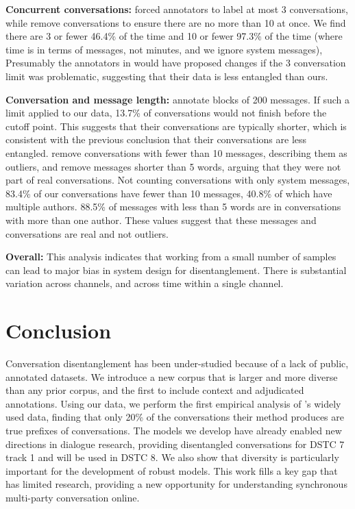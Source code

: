\documentclass[11pt,a4paper]{article}
\newcommand{\tightparagraph}[1]{\noindent\textbf{#1:}}
\begin{document}
\tightparagraph{Concurrent conversations}
\citet{Adams:2008} forced annotators to label at most 3 conversations, while \citet{Jiang:NAACL:2018} remove conversations to ensure there are no more than 10 at once.
We find there are 3 or fewer 46.4\% of the time and 10 or fewer 97.3\% of the time (where time is in terms of messages, not minutes, and we ignore system messages),
Presumably the annotators in \citet{Adams:2008} would have proposed changes if the 3 conversation limit was problematic, suggesting that their data is less entangled than ours.

\tightparagraph{Conversation and message length}
\citet{Adams:2008} annotate blocks of 200 messages.
If such a limit applied to our data, 13.7\% of conversations would not finish before the cutoff point.
This suggests that their conversations are typically shorter, which is consistent with the previous conclusion that their conversations are less entangled.
\citet{Jiang:NAACL:2018} remove conversations with fewer than 10 messages, describing them as outliers, and remove messages shorter than 5 words, arguing that they were not part of real conversations.
Not counting conversations with only system messages, 83.4\% of our conversations have fewer than 10 messages, 40.8\% of which have multiple authors.
88.5\% of messages with less than 5 words are in conversations with more than one author.
These values suggest that these messages and conversations are real and not outliers.

\tightparagraph{Overall}
This analysis indicates that working from a small number of samples can lead to major bias in system design for disentanglement.
There is substantial variation across channels, and across time within a single channel.

\section{Conclusion}

Conversation disentanglement has been under-studied because of a lack of public, annotated datasets.
We introduce a new corpus that is larger and more diverse than any prior corpus, and the first to include context and adjudicated annotations.
Using our data, we perform the first empirical analysis of \citet{Lowe:2015,Lowe:2017:DD}'s widely used data, finding that only 20\% of the conversations their method produces are true prefixes of conversations.
The models we develop have already enabled new directions in dialogue research, providing disentangled conversations for DSTC 7 track 1 \citep{dstc19task1,ws18dstc} and will be used in DSTC 8.
We also show that diversity is particularly important for the development of robust models.
This work fills a key gap that has limited research, providing a new opportunity for understanding synchronous multi-party conversation online.
\end{document}
